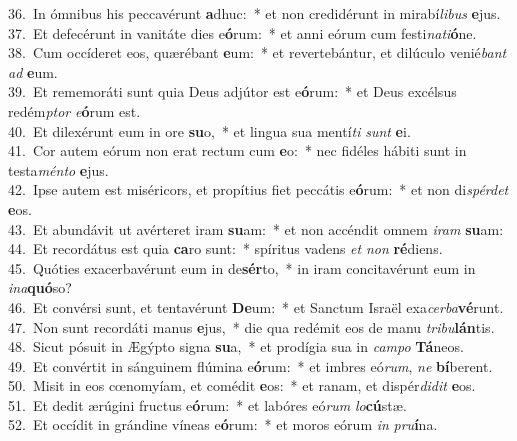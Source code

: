 {36.~}In ómnibus his peccavérunt \textbf{a}dhuc:~* et non credidérunt in mirabí\textit{li}\textit{bus} \textbf{e}jus.\\
{37.~}Et defecérunt in vanitáte dies e\textbf{ó}rum:~* et anni eórum cum festi\textit{na}\textit{ti}\textbf{ó}ne.\\
{38.~}Cum occíderet eos, quærébant \textbf{e}um:~* et revertebántur, et dilúculo venié\textit{bant} \textit{ad} \textbf{e}um.\\
{39.~}Et rememoráti sunt quia Deus adjútor est e\textbf{ó}rum:~* et Deus excélsus redém\textit{ptor} \textit{e}\textbf{ó}rum est.\\
{40.~}Et dilexérunt eum in ore \textbf{su}o,~* et lingua sua mentí\textit{ti} \textit{sunt} \textbf{e}i.\\
{41.~}Cor autem eórum non erat rectum cum \textbf{e}o:~* nec fidéles hábiti sunt in testa\textit{mén}\textit{to} \textbf{e}jus.\\
{42.~}Ipse autem est miséricors, et propítius fiet peccátis e\textbf{ó}rum:~* et non di\textit{spér}\textit{det} \textbf{e}os.\\
{43.~}Et abundávit ut avérteret iram \textbf{su}am:~* et non accéndit omnem \textit{i}\textit{ram} \textbf{su}am:\\
{44.~}Et recordátus est quia \textbf{ca}ro sunt:~* spíritus vadens \textit{et} \textit{non} \textbf{ré}diens.\\
{45.~}Quóties exacerbavérunt eum in de\textbf{sér}to,~* in iram concitavérunt eum in \textit{i}\textit{na}\textbf{quó}so?\\
{46.~}Et convérsi sunt, et tentavérunt \textbf{De}um:~* et Sanctum Israël exa\textit{cer}\textit{ba}\textbf{vé}runt.\\
{47.~}Non sunt recordáti manus \textbf{e}jus,~* die qua redémit eos de manu \textit{tri}\textit{bu}\textbf{lán}tis.\\
{48.~}Sicut pósuit in Ægýpto signa \textbf{su}a,~* et prodígia sua in \textit{cam}\textit{po} \textbf{Tá}neos.\\
{49.~}Et convértit in sánguinem flúmina e\textbf{ó}rum:~* et imbres eó\textit{rum}, \textit{ne} \textbf{bí}berent.\\
{50.~}Misit in eos cœnomyíam, et comédit \textbf{e}os:~* et ranam, et dispér\textit{di}\textit{dit} \textbf{e}os.\\
{51.~}Et dedit ærúgini fructus e\textbf{ó}rum:~* et labóres eó\textit{rum} \textit{lo}\textbf{cú}stæ.\\
{52.~}Et occídit in grándine víneas e\textbf{ó}rum:~* et moros eórum \textit{in} \textit{pru}\textbf{í}na.\\
